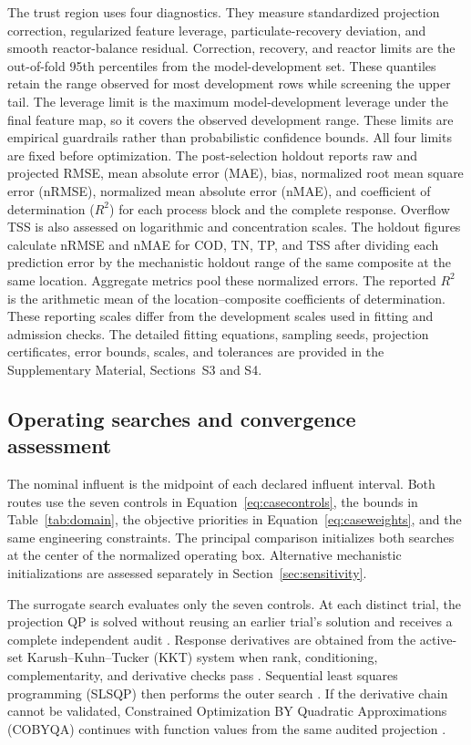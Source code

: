 \documentclass[a4paper,fleqn]{cas-sc}
\begin{document}
The trust region uses four diagnostics. They measure standardized projection correction, regularized feature leverage, particulate-recovery deviation, and smooth reactor-balance residual. Correction, recovery, and reactor limits are the out-of-fold 95th percentiles from the model-development set. These quantiles retain the range observed for most development rows while screening the upper tail. The leverage limit is the maximum model-development leverage under the final feature map, so it covers the observed development range. These limits are empirical guardrails rather than probabilistic confidence bounds. All four limits are fixed before optimization. The post-selection holdout reports raw and projected RMSE, mean absolute error (MAE), bias, normalized root mean square error (nRMSE), normalized mean absolute error (nMAE), and coefficient of determination ($R^2$) for each process block and the complete response. Overflow TSS is also assessed on logarithmic and concentration scales. The holdout figures calculate nRMSE and nMAE for COD, TN, TP, and TSS after dividing each prediction error by the mechanistic holdout range of the same composite at the same location. Aggregate metrics pool these normalized errors. The reported $R^2$ is the arithmetic mean of the location--composite coefficients of determination. These reporting scales differ from the development scales used in fitting and admission checks. The detailed fitting equations, sampling seeds, projection certificates, error bounds, scales, and tolerances are provided in the Supplementary Material, Sections~S3 and S4.

\subsection{Operating searches and convergence assessment}

The nominal influent is the midpoint of each declared influent interval. Both routes use the seven controls in Equation~\eqref{eq:casecontrols}, the bounds in Table~\ref{tab:domain}, the objective priorities in Equation~\eqref{eq:caseweights}, and the same engineering constraints. The principal comparison initializes both searches at the center of the normalized operating box. Alternative mechanistic initializations are assessed separately in Section~\ref{sec:sensitivity}.

The surrogate search evaluates only the seven controls. At each distinct trial, the projection QP is solved without reusing an earlier trial's solution and receives a complete independent audit \citep{Stellato2020,Boyd2004}. Response derivatives are obtained from the active-set Karush--Kuhn--Tucker (KKT) system when rank, conditioning, complementarity, and derivative checks pass \citep{Tondel2003}. Sequential least squares programming (SLSQP) then performs the outer search \citep{Kraft1988}. If the derivative chain cannot be validated, Constrained Optimization BY Quadratic Approximations (COBYQA) continues with function values from the same audited projection \citep{Ragonneau2022}.
\end{document}
